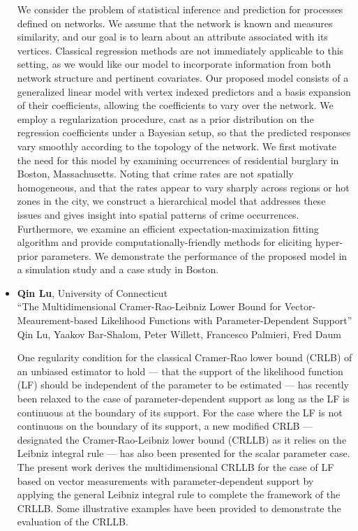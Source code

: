\begin{itemize}
We consider the problem of statistical inference and prediction for
processes defined on networks. We assume that the network is known and measures similarity, 
and our goal is to learn about an attribute
associated with its vertices. Classical regression methods are not immediately
applicable to this setting, as we would like our model to incorporate
information from both network structure and pertinent covariates. Our proposed
model consists of a generalized linear model with vertex indexed predictors
and a basis expansion of their coefficients, allowing the coefficients to vary
over the network. We employ a regularization procedure, cast as a prior
distribution on the regression coefficients under a Bayesian setup, so that
the predicted responses vary smoothly according to the topology of the
network. We first motivate the need for this model by examining occurrences of
residential burglary in Boston, Massachusetts. Noting that crime rates are
not spatially homogeneous, and that the rates appear to vary sharply across
regions or hot zones in the city, we construct a hierarchical model that
addresses these issues and gives insight into spatial patterns of crime
occurrences. Furthermore, we examine an efficient expectation-maximization
fitting algorithm and provide computationally-friendly methods for eliciting
hyper-prior parameters. We demonstrate the performance of the proposed model
in a simulation study and a case study in Boston.

\item \textbf{Qin Lu}, University of Connecticut \\
``The Multidimensional Cramer-Rao-Leibniz Lower Bound for Vector-Meaurement-based Likelihood Functions with Parameter-Dependent Support'' \\
Qin Lu, Yaakov Bar-Shalom, Peter Willett, Francesco Palmieri, Fred Daum


One regularity condition  for the classical Cramer-Rao lower bound (CRLB) of an unbiased estimator to hold --- that the support of the likelihood function (LF) should be independent of the parameter to be estimated --- has recently been relaxed to the case of parameter-dependent support as long as the LF is continuous at the boundary of its support. For the case where the LF is not continuous on the boundary of its support, a new modified CRLB --- designated the Cramer-Rao-Leibniz lower bound (CRLLB) as it relies on the Leibniz integral rule --- has also been presented for the scalar parameter case. The present work derives the multidimensional CRLLB for the case of LF based on vector measurements with parameter-dependent support by applying the general Leibniz integral rule to complete the framework of the CRLLB. Some illustrative examples have been provided to demonstrate the evaluation of the CRLLB.


\end{itemize}
